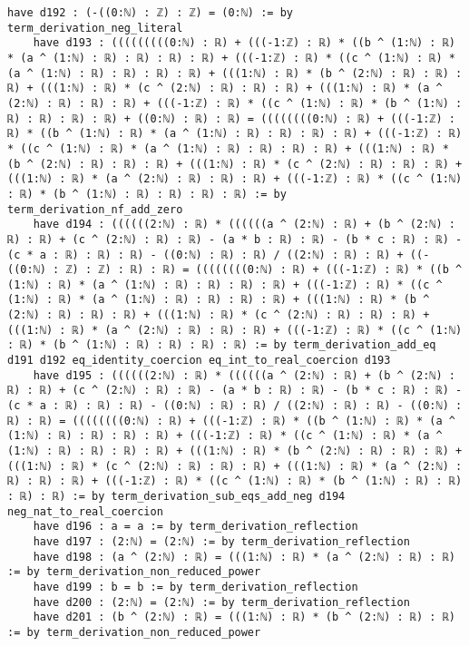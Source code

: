 \documentclass{article}
\begin{document}
\begin{tcolorbox}[colback=white!10, width=\linewidth]
\begin{lstlisting}[language=Lean4]
    have d192 : (-((0:ℕ) : ℤ) : ℤ) = (0:ℕ) := by term_derivation_neg_literal
    have d193 : (((((((((0:ℕ) : ℝ) + (((-1:ℤ) : ℝ) * ((b ^ (1:ℕ) : ℝ) * (a ^ (1:ℕ) : ℝ) : ℝ) : ℝ) : ℝ) + (((-1:ℤ) : ℝ) * ((c ^ (1:ℕ) : ℝ) * (a ^ (1:ℕ) : ℝ) : ℝ) : ℝ) : ℝ) + (((1:ℕ) : ℝ) * (b ^ (2:ℕ) : ℝ) : ℝ) : ℝ) + (((1:ℕ) : ℝ) * (c ^ (2:ℕ) : ℝ) : ℝ) : ℝ) + (((1:ℕ) : ℝ) * (a ^ (2:ℕ) : ℝ) : ℝ) : ℝ) + (((-1:ℤ) : ℝ) * ((c ^ (1:ℕ) : ℝ) * (b ^ (1:ℕ) : ℝ) : ℝ) : ℝ) : ℝ) + ((0:ℕ) : ℝ) : ℝ) = ((((((((0:ℕ) : ℝ) + (((-1:ℤ) : ℝ) * ((b ^ (1:ℕ) : ℝ) * (a ^ (1:ℕ) : ℝ) : ℝ) : ℝ) : ℝ) + (((-1:ℤ) : ℝ) * ((c ^ (1:ℕ) : ℝ) * (a ^ (1:ℕ) : ℝ) : ℝ) : ℝ) : ℝ) + (((1:ℕ) : ℝ) * (b ^ (2:ℕ) : ℝ) : ℝ) : ℝ) + (((1:ℕ) : ℝ) * (c ^ (2:ℕ) : ℝ) : ℝ) : ℝ) + (((1:ℕ) : ℝ) * (a ^ (2:ℕ) : ℝ) : ℝ) : ℝ) + (((-1:ℤ) : ℝ) * ((c ^ (1:ℕ) : ℝ) * (b ^ (1:ℕ) : ℝ) : ℝ) : ℝ) : ℝ) := by term_derivation_nf_add_zero
    have d194 : ((((((2:ℕ) : ℝ) * ((((((a ^ (2:ℕ) : ℝ) + (b ^ (2:ℕ) : ℝ) : ℝ) + (c ^ (2:ℕ) : ℝ) : ℝ) - (a * b : ℝ) : ℝ) - (b * c : ℝ) : ℝ) - (c * a : ℝ) : ℝ) : ℝ) - ((0:ℕ) : ℝ) : ℝ) / ((2:ℕ) : ℝ) : ℝ) + ((-((0:ℕ) : ℤ) : ℤ) : ℝ) : ℝ) = ((((((((0:ℕ) : ℝ) + (((-1:ℤ) : ℝ) * ((b ^ (1:ℕ) : ℝ) * (a ^ (1:ℕ) : ℝ) : ℝ) : ℝ) : ℝ) + (((-1:ℤ) : ℝ) * ((c ^ (1:ℕ) : ℝ) * (a ^ (1:ℕ) : ℝ) : ℝ) : ℝ) : ℝ) + (((1:ℕ) : ℝ) * (b ^ (2:ℕ) : ℝ) : ℝ) : ℝ) + (((1:ℕ) : ℝ) * (c ^ (2:ℕ) : ℝ) : ℝ) : ℝ) + (((1:ℕ) : ℝ) * (a ^ (2:ℕ) : ℝ) : ℝ) : ℝ) + (((-1:ℤ) : ℝ) * ((c ^ (1:ℕ) : ℝ) * (b ^ (1:ℕ) : ℝ) : ℝ) : ℝ) : ℝ) := by term_derivation_add_eq d191 d192 eq_identity_coercion eq_int_to_real_coercion d193
    have d195 : ((((((2:ℕ) : ℝ) * ((((((a ^ (2:ℕ) : ℝ) + (b ^ (2:ℕ) : ℝ) : ℝ) + (c ^ (2:ℕ) : ℝ) : ℝ) - (a * b : ℝ) : ℝ) - (b * c : ℝ) : ℝ) - (c * a : ℝ) : ℝ) : ℝ) - ((0:ℕ) : ℝ) : ℝ) / ((2:ℕ) : ℝ) : ℝ) - ((0:ℕ) : ℝ) : ℝ) = ((((((((0:ℕ) : ℝ) + (((-1:ℤ) : ℝ) * ((b ^ (1:ℕ) : ℝ) * (a ^ (1:ℕ) : ℝ) : ℝ) : ℝ) : ℝ) + (((-1:ℤ) : ℝ) * ((c ^ (1:ℕ) : ℝ) * (a ^ (1:ℕ) : ℝ) : ℝ) : ℝ) : ℝ) + (((1:ℕ) : ℝ) * (b ^ (2:ℕ) : ℝ) : ℝ) : ℝ) + (((1:ℕ) : ℝ) * (c ^ (2:ℕ) : ℝ) : ℝ) : ℝ) + (((1:ℕ) : ℝ) * (a ^ (2:ℕ) : ℝ) : ℝ) : ℝ) + (((-1:ℤ) : ℝ) * ((c ^ (1:ℕ) : ℝ) * (b ^ (1:ℕ) : ℝ) : ℝ) : ℝ) : ℝ) := by term_derivation_sub_eqs_add_neg d194 neg_nat_to_real_coercion
    have d196 : a = a := by term_derivation_reflection
    have d197 : (2:ℕ) = (2:ℕ) := by term_derivation_reflection
    have d198 : (a ^ (2:ℕ) : ℝ) = (((1:ℕ) : ℝ) * (a ^ (2:ℕ) : ℝ) : ℝ) := by term_derivation_non_reduced_power
    have d199 : b = b := by term_derivation_reflection
    have d200 : (2:ℕ) = (2:ℕ) := by term_derivation_reflection
    have d201 : (b ^ (2:ℕ) : ℝ) = (((1:ℕ) : ℝ) * (b ^ (2:ℕ) : ℝ) : ℝ) := by term_derivation_non_reduced_power

\end{lstlisting}
\end{tcolorbox}
\end{document}
